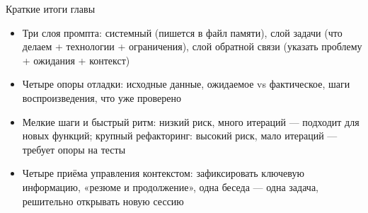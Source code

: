 \begin{tcbsummary}{Краткие итоги главы}
\begin{itemize}
  \item Три слоя промпта: системный (пишется в файл памяти), слой задачи (что делаем + технологии + ограничения), слой обратной связи (указать проблему + ожидания + контекст)
  \item Четыре опоры отладки: исходные данные, ожидаемое vs фактическое, шаги воспроизведения, что уже проверено
  \item Мелкие шаги и быстрый ритм: низкий риск, много итераций — подходит для новых функций; крупный рефакторинг: высокий риск, мало итераций — требует опоры на тесты
  \item Четыре приёма управления контекстом: зафиксировать ключевую информацию, «резюме и продолжение», одна беседа — одна задача, решительно открывать новую сессию
\end{itemize}

\end{tcbsummary}
